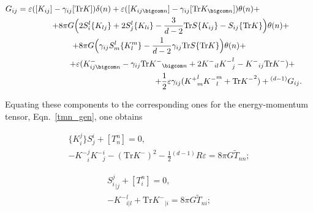 \begin{gather}

G_{ij} = \varepsilon([K_{ij}]-\gamma_{ij}[\mbox{Tr}K])\delta(n) + \varepsilon([K_{ij \bigcom  n}]-

\gamma_{ij}[\mbox{Tr}K_{\bigcom n}])\theta(n)+ \hspace{2.3cm}\\

\hspace{1cm} 

+ 8\pi G\Bigl(2S_i^l\{K_{lj}\}+2S_j^l\{K_{li}\}-\frac{3}{d-2}\mbox{Tr}S\{K_{ij}\}-S_{ij} \{\mbox{Tr}K\}\Bigr)\theta(n)+\\


+ 8\pi G\Bigl(\gamma_{ij}S_m^l\{K_l^m\} - \frac{1}{d-2}\gamma_{ij}\mbox{Tr}S \{\mbox{Tr}K\}\Bigr)\theta(n) + \\

\hspace{2cm} 

+  \varepsilon(K^{-}_{ij\bigcom n}-\gamma_{ij}{\mbox{Tr}K^-}_{\bigcom n}+2{K^-}_{il}{K^-}_j^l-{K^-}_{ij}{\mbox{Tr}K^-}) +\\

\hspace{6cm} 

+ \frac{1}{2}\varepsilon\gamma_{ij}({K^+}_m^l{K^-}_l^m+{\mbox{Tr}K^-}^2)+{ ^{(d-1)}}G_{ij}.

\end{gather}

Equating these components to the corresponding ones for the energy-momentum tensor, Eqn.~\eqref{tmn_gen}, one obtains

\begin{gather}

\label{eeq_nn}

\{K_i^j\}S_j^i+[T_n^n] = 0,\\

- {K^-}_i^j {K^-}_j^i -(\mbox{Tr}{K^-})^2-\frac{1}{2}{ ^{(d-1)}}R\varepsilon = 8\pi G\tilde T_{nn};

\end{gather}

\begin{gather}

\label{eeq_ni}

{S_i^j}_{|j}+[T_i^n] = 0,\\

-{K^-}^l_{i|l}+\mbox{Tr}{K^-}_{|i} =  8\pi G\tilde T_{ni};

\end{gather}

